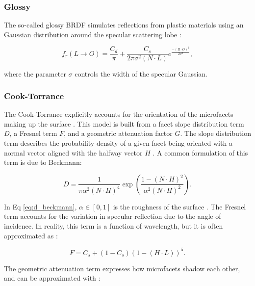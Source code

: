 \subsubsection{Glossy}

The so-called glossy BRDF simulates reflections from plastic materials using an Gaussian distribution around the specular scattering lobe \cite{duvenhage2013}:

\begin{equation} \label{eq:brdf_glossy}
  f_r(L \rightarrow O) = \frac{C_d}{\pi} + \frac{C_s}{2\pi \sigma^2 \left(N \cdot L\right)}  e^{\frac{-\left( R \cdot O \right)^2}{2\sigma^2}},
\end{equation}

where the parameter $\sigma$ controls the width of the specular Gaussian.

\subsubsection{Cook-Torrance}

The Cook-Torrance explicitly accounts for the orientation of the microfacets making up the surface \cite{cook1982}. This model is built from a facet slope distribution term $D$, a Fresnel term $F$, and a geometric attenuation factor $G$. The slope distribution term describes the probability density of a given facet being oriented with a normal vector aligned with the halfway vector $H$ \cite{cook1982}. A common formulation of this term is due to Beckmann:

\begin{equation} \label{eq:d_beckmann}
  D = \frac{1}{\pi \alpha^2 \left( N \cdot H \right)^4} \exp\left( \frac{1 - \left(N \cdot H\right)^2}{\alpha^2 \left(N \cdot H\right)^2} \right).
\end{equation}

In Eq \ref{eq:d_beckmann}, $\alpha \in [0, 1]$ is the roughness of the surface \cite{cook1982}. The Fresnel term accounts for the variation in specular reflection due to the angle of incidence. In reality, this term is a function of wavelength, but it is often approximated as \cite{cook1982}:

\begin{equation} \label{eq:fresnel_approx}
  F = C_s + \left( 1 - C_s \right) \left( 1 - \left( H \cdot L \right) \right) ^ 5.
\end{equation}

The geometric attenuation term expresses how microfacets shadow each other, and can be approximated with \cite{cook1982}:

